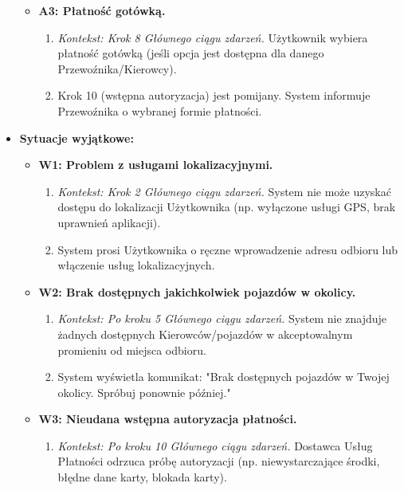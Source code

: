 \documentclass[a4paper,12pt]{article}
\begin{document}
\begin{itemize}
\begin{itemize}
\begin{enumerate}
                \end{enumerate}
             \item \textbf{A3: Płatność gotówką.}
                \begin{enumerate}
                    \item \textit{Kontekst: Krok 8 Głównego ciągu zdarzeń.} Użytkownik wybiera płatność gotówką (jeśli opcja jest dostępna dla danego Przewoźnika/Kierowcy).
                    \item Krok 10 (wstępna autoryzacja) jest pomijany. System informuje Przewoźnika o wybranej formie płatności.
                \end{enumerate}
        \end{itemize}
    \item \textbf{Sytuacje wyjątkowe:}
        \begin{itemize}
            \item \textbf{W1: Problem z usługami lokalizacyjnymi.}
                \begin{enumerate}
                    \item \textit{Kontekst: Krok 2 Głównego ciągu zdarzeń.} System nie może uzyskać dostępu do lokalizacji Użytkownika (np. wyłączone usługi GPS, brak uprawnień aplikacji).
                    \item System prosi Użytkownika o ręczne wprowadzenie adresu odbioru lub włączenie usług lokalizacyjnych.
                \end{enumerate}
            \item \textbf{W2: Brak dostępnych jakichkolwiek pojazdów w okolicy.}
                \begin{enumerate}
                    \item \textit{Kontekst: Po kroku 5 Głównego ciągu zdarzeń.} System nie znajduje żadnych dostępnych Kierowców/pojazdów w akceptowalnym promieniu od miejsca odbioru.
                    \item System wyświetla komunikat: "Brak dostępnych pojazdów w Twojej okolicy. Spróbuj ponownie później."
                \end{enumerate}
            \item \textbf{W3: Nieudana wstępna autoryzacja płatności.}
                \begin{enumerate}
                    \item \textit{Kontekst: Po kroku 10 Głównego ciągu zdarzeń.} Dostawca Usług Płatności odrzuca próbę autoryzacji (np. niewystarczające środki, błędne dane karty, blokada karty).

\end{enumerate}
\end{itemize}
\end{itemize}
\end{document}
